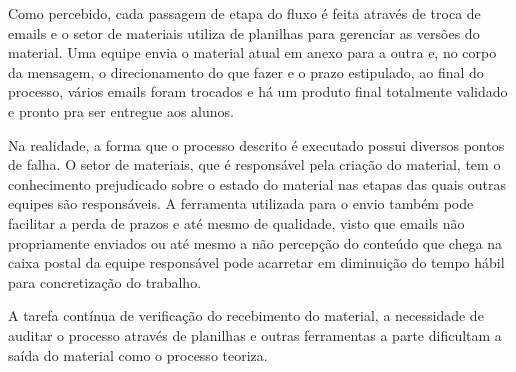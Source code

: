 Como percebido, cada passagem de etapa do fluxo é feita através de troca de emails e o setor de materiais utiliza de planilhas para gerenciar as versões do material. Uma equipe envia o material atual em anexo para a outra e, no corpo da mensagem, o direcionamento do que fazer e o prazo estipulado, ao final do processo, vários emails foram trocados e há um produto final totalmente validado e pronto pra ser entregue aos alunos.

Na realidade, a forma que o processo descrito é executado possui diversos pontos de falha. O setor de materiais, que é responsável pela criação do material, tem o conhecimento prejudicado sobre o estado do material nas etapas das quais outras equipes são responsáveis. A ferramenta utilizada para o envio também pode facilitar a perda de prazos e até mesmo de qualidade, visto que emails não propriamente enviados ou até mesmo a não percepção do conteúdo que chega na caixa postal da equipe responsável pode acarretar em diminuição do tempo hábil para concretização do trabalho.

A tarefa contínua de verificação do recebimento do material, a necessidade de auditar o processo através de planilhas e outras ferramentas a parte dificultam a saída do material como o processo teoriza. 

